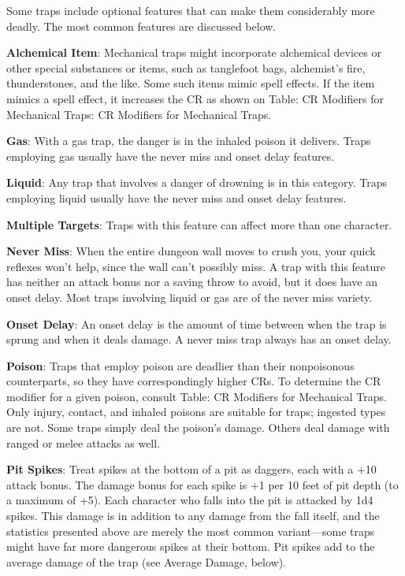				
Some traps include optional features that can make them considerably more deadly. The most common features are discussed below.
				
\textbf{Alchemical Item}: Mechanical traps might incorporate alchemical devices or other special substances or items, such as tanglefoot bags, alchemist's fire, thunderstones, and the like. Some such items mimic spell effects. If the item mimics a spell effect, it increases the CR as shown on Table: CR Modifiers for Mechanical Traps: CR Modifiers for Mechanical Traps.
				
\textbf{Gas}: With a gas trap, the danger is in the inhaled poison it delivers. Traps employing gas usually have the never miss and onset delay features.
				
\textbf{Liquid}: Any trap that involves a danger of drowning is in this category. Traps employing liquid usually have the never miss and onset delay features. 
				
\textbf{Multiple Targets}: Traps with this feature can affect more than one character.
				
\textbf{Never Miss}: When the entire dungeon wall moves to crush you, your quick reflexes won't help, since the wall can't possibly miss. A trap with this feature has neither an attack bonus nor a saving throw to avoid, but it does have an onset delay. Most traps involving liquid or gas are of the never miss variety. 
				
\textbf{Onset Delay}: An onset delay is the amount of time between when the trap is sprung and when it deals damage. A never miss trap always has an onset delay.
				
\textbf{Poison}: Traps that employ poison are deadlier than their nonpoisonous counterparts, so they have correspondingly higher CRs. To determine the CR modifier for a given poison, consult Table: CR Modifiers for Mechanical Traps. Only injury, contact, and inhaled poisons are suitable for traps; ingested types are not. Some traps simply deal the poison's damage. Others deal damage with ranged or melee attacks as well.
				
\textbf{Pit Spikes}: Treat spikes at the bottom of a pit as daggers, each with a +10 attack bonus. The damage bonus for each spike is +1 per 10 feet of pit depth (to a maximum of +5). Each character who falls into the pit is attacked by 1d4 spikes. This damage is in addition to any damage from the fall itself, and the statistics presented above are merely the most common variant---some traps might have far more dangerous spikes at their bottom. Pit spikes add to the average damage of the trap (see Average Damage, below).
				
